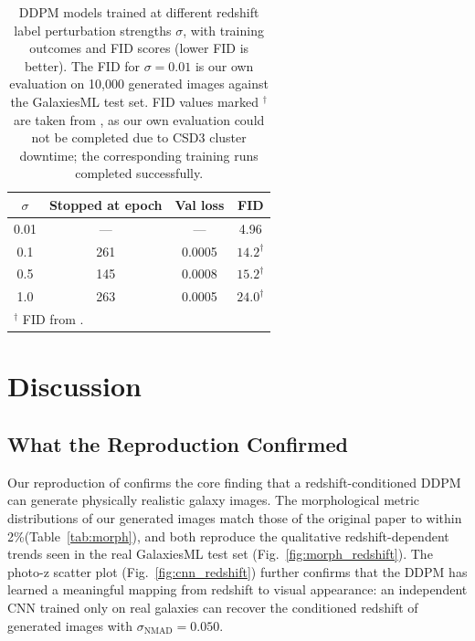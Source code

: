 \documentclass[fleqn,usenatbib]{mnras}
\begin{document}
\begin{table}
    \centering
    \caption{DDPM models trained at different redshift label
    perturbation strengths $\sigma$, with training outcomes and FID
    scores (lower FID is better).
    The FID for $\sigma = 0.01$ is our own evaluation on 10,000
    generated images against the GalaxiesML test set.
    FID values marked $^\dagger$ are taken from \citet{lizarraga2024},
    as our own evaluation could not be completed due to CSD3 cluster
    downtime; the corresponding training runs completed successfully.}
    \label{tab:sigma_fid}
    \begin{tabular}{cccc}
        \hline
        $\sigma$ & Stopped at epoch & Val loss & FID \\
        \hline
        0.01 & ---  & ---    & 4.96 \\
        0.1  & 261  & 0.0005 & $14.2^\dagger$ \\
        0.5  & 145  & 0.0008 & $15.2^\dagger$ \\
        1.0  & 263  & 0.0005 & $24.0^\dagger$ \\
        \hline
        \multicolumn{4}{l}{$^\dagger$ FID from \citet{lizarraga2024}.}
    \end{tabular}
\end{table}

\clearpage
\section{Discussion}
\label{sec:discussion}

\subsection{What the Reproduction Confirmed}

Our reproduction of \citet{lizarraga2024} confirms the core finding
that a redshift-conditioned DDPM can generate physically realistic
galaxy images.
The morphological metric distributions of our generated images match
those of the original paper to within 2\%(Table~\ref{tab:morph}),
and both reproduce the qualitative redshift-dependent trends seen in
the real GalaxiesML test set (Fig.~\ref{fig:morph_redshift}).
The photo-z scatter plot (Fig.~\ref{fig:cnn_redshift}) further
confirms that the DDPM has learned a meaningful mapping from redshift
to visual appearance: an independent CNN trained only on real galaxies
can recover the conditioned redshift of generated images with
$\sigma_\mathrm{NMAD} = 0.050$.
\end{document}
